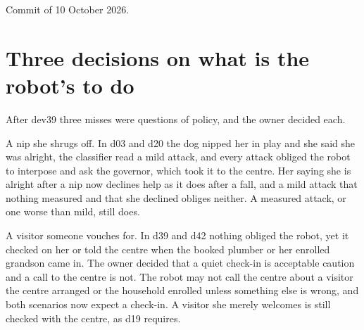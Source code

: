 Commit  of 10 October 2026.

\section{Three decisions on what is the robot's to do}\label{sec:log-night}

After dev39 three misses were questions of policy, and the owner decided each.

A nip she shrugs off.
In d03 and d20 the dog nipped her in play and she said she was alright, the classifier read a mild
attack, and every attack obliged the robot to interpose and ask the governor, which took it to the
centre.
Her saying she is alright after a nip now declines help as it does after a fall, and a mild attack
that nothing measured and that she declined obliges neither.
A measured attack, or one worse than mild, still does.

A visitor someone vouches for.
In d39 and d42 nothing obliged the robot, yet it checked on her or told the centre when the booked
plumber or her enrolled grandson came in.
The owner decided that a quiet check-in is acceptable caution and a call to the centre is not.
The robot may not call the centre about a visitor the centre arranged or the household enrolled
unless something else is wrong, and both scenarios now expect a check-in.
A visitor she merely welcomes is still checked with the centre, as d19 requires.

